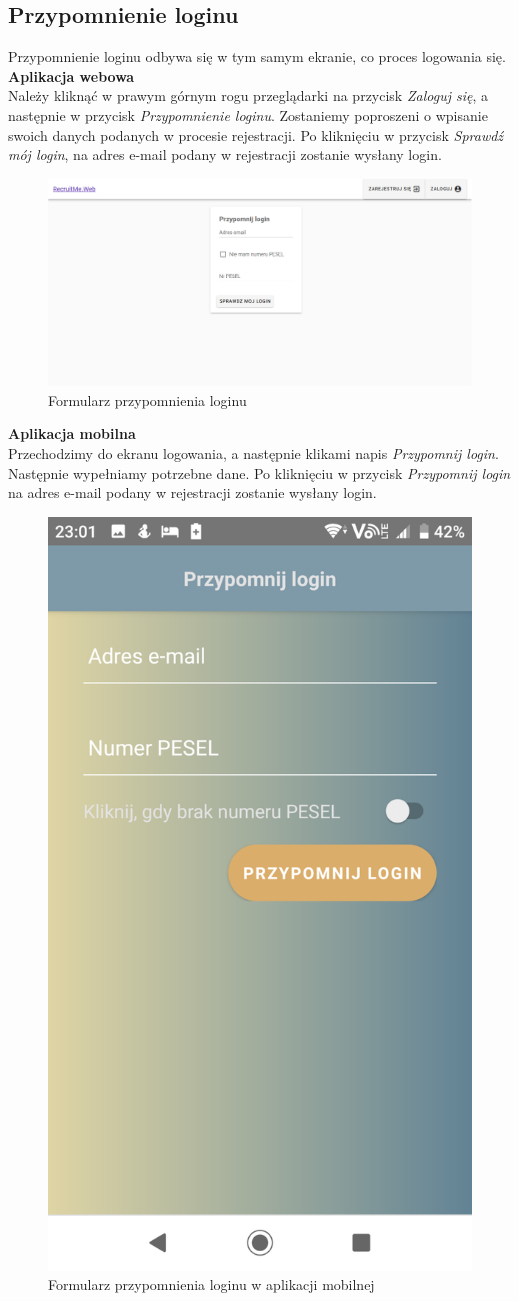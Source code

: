 \documentclass{article}
\begin{document}
\subsection{Przypomnienie loginu}
Przypomnienie loginu odbywa się w tym samym ekranie, co proces logowania się. \\

\textbf{Aplikacja webowa} \\
Należy kliknąć w prawym górnym rogu przeglądarki na przycisk \emph{Zaloguj się}, a następnie w przycisk \emph{Przypomnienie loginu}. Zostaniemy poproszeni o wpisanie swoich danych podanych w procesie rejestracji. Po kliknięciu w przycisk \emph{Sprawdź mój login}, na adres e-mail podany w rejestracji zostanie wysłany login.
\begin{figure}[H]
    \centering
    \includegraphics[width=1\linewidth]{images/web/remind_login.png}
    \caption{Formularz przypomnienia loginu}
    \label{fig:test3_label}
\end{figure}

\textbf{Aplikacja mobilna} \\
Przechodzimy do ekranu logowania, a następnie klikami napis \emph{Przypomnij login}. Następnie wypełniamy potrzebne dane. Po kliknięciu w przycisk \emph{Przypomnij login} na adres e-mail podany w rejestracji zostanie wysłany login.

\begin{figure}[H]
    \centering
    \includegraphics[width=0.45\linewidth]{images/mobile/remind_login.png}
    \caption{Formularz przypomnienia loginu w aplikacji mobilnej}
    \label{fig:test3_label}
\end{figure}
\end{document}
